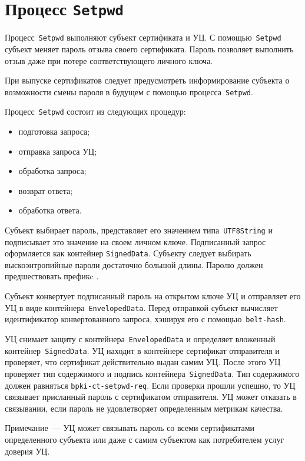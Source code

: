 \section{Процесс \texttt{Setpwd}}\label{PROCESSES.Setpwd}

Процесс~\texttt{Setpwd} выполняют субъект сертификата и УЦ.
С помощью~\texttt{Setpwd} субъект меняет пароль отзыва своего 
сертификата. Пароль позволяет выполнить отзыв даже при потере 
соответствующего личного ключа.

При выпуске сертификатов следует предусмотреть информирование субъекта 
о возможности смены пароля в будущем с помощью процесса~\texttt{Setpwd}.

Процесс~\texttt{Setpwd} состоит из следующих процедур:
\begin{itemize}
\item
подготовка запроса;
\item
отправка запроса УЦ;
\item
обработка запроса;
\item
возврат ответа;
\item
обработка ответа.
\end{itemize}

Субъект выбирает пароль, представляет его значением типа~\texttt{UTF8String}
и подписывает это значение на своем личном ключе.
Подписанный запрос оформляется как контейнер \texttt{SignedData}.
%
Субъекту следует выбирать выскоэнтропийные пароли достаточно большой 
длины. Паролю должен предшествовать префикc .

Субъект конвертует подписанный пароль на открытом ключе УЦ
и отправляет его УЦ в виде контейнера~\texttt{EnvelopedData}.
Перед отправкой субъект вычисляет идентификатор конвертованного запроса,
хэшируя его с помощью~\texttt{belt-hash}.

УЦ снимает защиту с контейнера~\texttt{EnvelopedData} и определяет 
вложенный контейнер~\texttt{SignedData}. УЦ находит в контейнере
сертификат отправителя и проверяет, что сертификат действительно 
выдан самим УЦ. После этого УЦ проверяет тип содержимого и подпись 
контейнера~\texttt{SignedData}. Тип содержимого должен равняться
\texttt{bpki-ct-setpwd-req}. Если проверки прошли успешно, то УЦ  
связывает присланный пароль с сертификатом отправителя. УЦ может отказать 
в связывании, если пароль не удовлетворяет определенным метрикам качества.

\begin{note}
Примечание~--- УЦ может связывать пароль со всеми сертификатами
определенного субъекта или даже с самим субъектом как потребителем услуг
доверия УЦ.
\end{note}

